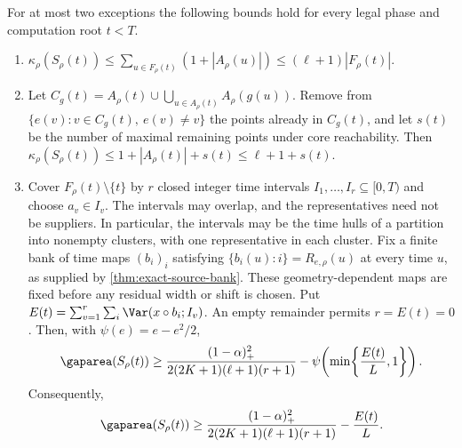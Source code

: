 \begin{proposition}\label{prop:continuation-covers}
For at most two exceptions the following bounds hold for every legal phase
and computation root $t<T$.
\begin{enumerate}[label=(\alph*)]
\item $\displaystyle\kappa_\rho(S_\rho(t))
 \le\sum_{u\in F_\rho(t)}(1+|A_\rho(u)|)
 \le(\ell+1)|F_\rho(t)|$.
\item Let $C_g(t)=A_\rho(t)\cup\bigcup_{u\in A_\rho(t)}A_\rho(g(u))$.
Remove from $\{e(v):v\in C_g(t),\ e(v)\ne v\}$ the points already in
$C_g(t)$, and let $s(t)$ be the number of maximal remaining points under
core reachability. Then
$\kappa_\rho(S_\rho(t))\le1+|A_\rho(t)|+s(t)\le\ell+1+s(t)$.
\item Cover $F_\rho(t)\setminus\{t\}$ by $r$ closed integer time intervals
$I_1,\ldots,I_r\subseteq[0,T)$ and choose $a_v\in I_v$.
The intervals may overlap, and the representatives need not be suppliers.
In particular, the intervals may be the time hulls of a partition into
nonempty clusters, with one representative in each cluster.
Fix a finite bank of time maps $(b_i)_i$ satisfying
$\{b_i(u):i\}=R_{e,\rho}(u)$ at every time $u$, as supplied by
\cref{thm:exact-source-bank}. These geometry-dependent maps are fixed
before any residual width or shift is chosen. Put
$E(t)=\sum_{v=1}^r\sum_i\Var(x\circ b_i;I_v)$.
An empty remainder permits $r=E(t)=0$. Then, with $\psi(e)=e-e^2/2$,
\[
 \gaparea(S_\rho(t))\ge
 \frac{(1-\alpha)_+^2}{2(2K+1)(\ell+1)(r+1)}
 -\psi\!\left(\min\!\left\{\frac{E(t)}L,1\right\}\right).
\]
Consequently,
\begin{equation}\label{eq:cluster-gap}
 \gaparea(S_\rho(t))\ge
 \frac{(1-\alpha)_+^2}{2(2K+1)(\ell+1)(r+1)}-\frac{E(t)}L.
\end{equation}
\end{enumerate}
\end{proposition}
